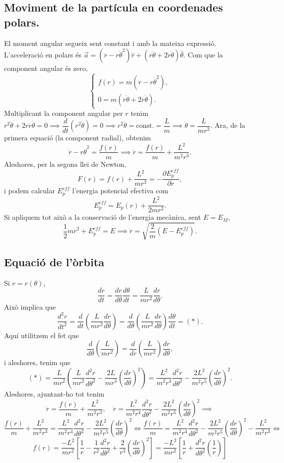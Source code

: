 \subsection{Moviment de la partícula en coordenades polars.}
El moment angular segueix sent constant i amb la mateixa expressió. L'acceleració en polars és $\vec a=(\ddot r-r\dot\theta^2)\hat r+(r\ddot\theta+2\dot r\dot\theta)\hat\theta$. Com que la component angular és zero,
\[
\begin{cases}
f(r)=m(\ddot r-r\dot\theta^2),\\
0=m(r\ddot\theta+2\dot r\dot\theta).
\end{cases}
\]
Multiplicant la component angular per $r$ tenim $r^2\ddot\theta+2r\dot r\dot\theta=0\implies\dfrac{d}{dt}(r^2\dot\theta)=0\implies r^2\dot\theta=\text{const.}=\dfrac{L}{m}\implies\dot\theta=\dfrac{L}{mr^2}.$ Ara, de la primera equació (la component radial), obtenim
\[
\ddot r-r\dot\theta^2=\dfrac{f(r)}{m}\implies\ddot r=\dfrac{f(r)}{m}+\dfrac{L^2}{m^2r^3}.
\]
Aleshores, per la segona llei de Newton,
\[
F(r)=f(r)+\dfrac{L^2}{mr^3}=-\dfrac{\partial E_p^{eff}}{\partial r},
\]
i podem calcular $E_p^{eff}$ l'energia potencial efectiva com
\[
E_p^{eff}=E_p(r)+\dfrac{L^2}{2mr^2}.
\]
Si apliquem tot això a la conservació de l'energia mecànica, sent $E=E_M$,
\[
\dfrac{1}{2}m\dot r^2+E_p^{eff}=E\implies\dot r=\sqrt{\dfrac{2}{m}\left(E-E_p^{eff}\right)}.
\]
\subsection{Equació de l'òrbita}
Si $r = r(\theta)$,
\[
\dfrac{dr}{dt}=\dfrac{dr}{d\theta}\dfrac{d\theta}{dt}=\dfrac{L}{mr^2}\dfrac{dr}{d\theta}.
\]
Això implica que
\[
\dfrac{d^2r}{dt^2}=\dfrac{d}{dt}\left(\dfrac{L}{mr^2}\dfrac{dr}{d\theta}\right)=\dfrac{d}{d\theta}\left(\dfrac{L}{mr^2}\dfrac{dr}{d\theta}\right)\dfrac{d\theta}{dt}=(*).
\]
Aquí utilitzem el fet que
\[
\dfrac{d}{d\theta}\left(\dfrac{L}{mr^2}\right)=\dfrac{d}{dr}\left(\dfrac{L}{mr^2}\right)\dfrac{dr}{d\theta},
\]
i aleshores, tenim que
\[
(*)=\dfrac{L}{mr^2}\left(\dfrac{L}{mr^2}\dfrac{d^2r}{d\theta^2}-\dfrac{2L}{mr^3}\left(\dfrac{dr}{d\theta}\right)^2\right)=\dfrac{L^2}{m^2r^4}\dfrac{d^2r}{d\theta^2}-\dfrac{2L^2}{m^2r^5}\left(\dfrac{dr}{d\theta}\right)^2.
\]
Aleshores, ajuntant-ho tot tenim
\[
\ddot r = \dfrac{f(r)}{m}+\dfrac{L^2}{m^2r^3}, \quad \ddot r = \dfrac{L^2}{m^2r^4}\dfrac{d^2r}{d\theta^2}-\dfrac{2L^2}{m^2r^5}\left(\dfrac{dr}{d\theta}\right)^2\implies
\]
\[
\dfrac{f(r)}{m}+\dfrac{L^2}{m^2r^3}=\dfrac{L^2}{m^2r^4}\dfrac{d^2r}{d\theta^2}-\dfrac{2L^2}{m^2r^5}\left(\dfrac{dr}{d\theta}\right)^2
\iff
\dfrac{f(r)}{m}=\dfrac{L^2}{m^2r^4}\dfrac{d^2r}{d\theta^2}-\dfrac{2L^2}{m^2r^5}\left(\dfrac{dr}{d\theta}\right)^2-\dfrac{L^2}{m^2r^3}
\iff
\]
\[
f(r)=\dfrac{-L^2}{mr^2}\left[\dfrac{1}{r}-\dfrac{1}{r^2}\dfrac{d^2r}{d\theta^2}+\dfrac{2}{r^3}\left(\dfrac{dr}{d\theta}\right)^2\right]=\dfrac{-L^2}{mr^2}\left[\dfrac{1}{r}+\dfrac{d^2r}{d\theta^2}\left(\dfrac{1}{r}\right)\right]
\]
